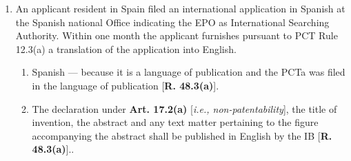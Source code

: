 \documentclass{report}
\begin{document}
\begin{enumerate}[label=\textbf{Answer \arabic*}]
    \item %
An applicant resident in Spain filed an international application in Spanish at the Spanish national Office indicating the EPO as International Searching Authority. Within one month the applicant furnishes pursuant to PCT Rule 12.3(a) a translation of the application into English.
    \begin{enumerate}[label=(\alph*)]
        \item  Spanish --- because it is a language of publication and the PCTa was filed in the language of publication [\textbf{R. 48.3(a)}].
\item  The declaration under \textbf{Art. 17.2(a)} [\textit{i.e., non-patentability}], the title of invention, the abstract and any text matter pertaining to the figure accompanying the abstract shall be published in English by the IB [\textbf{R. 48.3(a)}]..
    \end{enumerate}
   \end{enumerate}
\end{document}

